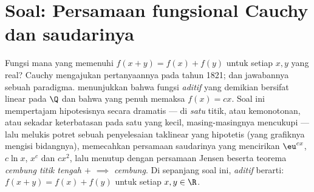 \section{Soal: Persamaan fungsional Cauchy dan saudarinya}

\begin{problem}[{Soal akhir pekan --- $f(x + y) = f(x) + f(y)$:
keteraturan memaksa kelinearan, beserta potret monsternya}]
\label{pb:b1:continuity:1}
Fungsi mana yang memenuhi $f(x + y) = f(x) + f(y)$ untuk setiap $x,
y$ yang real? Cauchy mengajukan pertanyaannya pada tahun 1821; dan jawabannya sebuah paradigma.
 menunjukkan bahwa fungsi \emph{aditif}
yang demikian bersifat linear pada $\Q$ dan bahwa  yang penuh memaksa $f(x)
= cx$. Soal ini mempertajam hipotesisnya secara dramatis ---
 di \emph{satu} titik, atau kemonotonan, atau sekadar
keterbatasan pada satu  yang kecil, masing-masingnya mencukupi --- lalu melukis
potret sebuah penyelesaian taklinear yang hipotetis (yang grafiknya
mengisi bidangnya), memecahkan persamaan saudarinya yang mencirikan
$\eu^{cx}$, $c\ln x$, $x^c$ dan $cx^2$, lalu menutup dengan persamaan Jensen
beserta teorema \emph{cembung titik tengah $+$ 
$\implies$ cembung}. Di sepanjang soal ini, \emph{aditif}
berarti: $f(x + y) = f(x) + f(y)$ untuk setiap $x, y \in \R$.


\end{problem}
